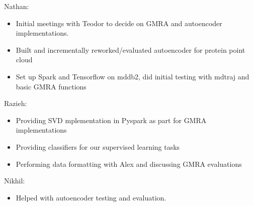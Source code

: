 \documentclass{article}
\begin{document}
	Nathan:
	\begin{itemize}
		\item Initial meetings with Teodor to decide on GMRA and autoencoder implementations.
		\item Built and incrementally reworked/evaluated autoencoder for protein point cloud
		\item Set up Spark and Tensorflow on mddb2, did initial testing with mdtraj and basic GMRA functions
	\end{itemize}
	
	Razieh:
	\begin{itemize}
		\item Providing SVD mplementation in Pyspark as part for GMRA implementations
		\item Providing classifiers for our supervised learning tasks
		\item Performing data formatting with Alex and discussing GMRA evaluations
	\end{itemize}
	
	Nikhil:
	\begin{itemize}
		\item Helped with autoencoder testing and evaluation.
	\end{itemize}
	
	\small
	{}
	
	
\end{document}
